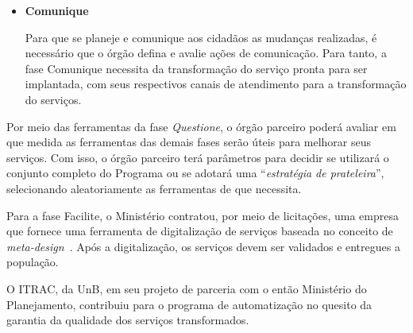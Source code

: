 \begin{itemize}
\item \textbf{Comunique}


Para que se planeje e comunique aos cidadãos as mudanças realizadas, é necessário que o órgão defina e avalie ações de comunicação. Para tanto, a fase Comunique necessita da transformação do serviço pronta para ser implantada, com seus respectivos canais de atendimento para a transformação do serviços. 

\end{itemize}

Por meio das ferramentas da fase \textit{Questione}, o órgão parceiro poderá avaliar em que medida as ferramentas das demais fases serão úteis para melhorar seus serviços. Com isso, o órgão parceiro terá parâmetros para decidir se utilizará o conjunto completo do Programa ou se adotará uma ``\textit{estratégia de prateleira}'', selecionando aleatoriamente as ferramentas de que necessita.

Para a fase Facilite, o Ministério contratou, por meio de licitações, uma empresa que fornece uma ferramenta de digitalização de serviços baseada no conceito de \textit{meta-design}~\cite{fogli2012meta}. Após a digitalização, os serviços devem ser validados e entregues a população. 

O ITRAC, da UnB, em seu projeto de parceria com o então Ministério do Planejamento, contribuiu para o programa de automatização no quesito da garantia da qualidade dos serviços transformados.

